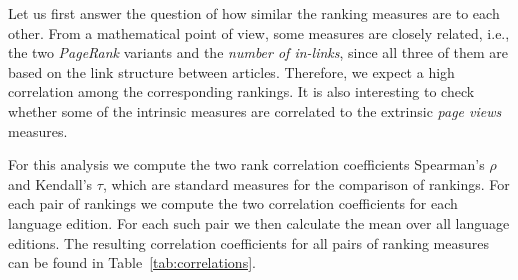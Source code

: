 \documentclass[a4paper,12pt]{scrartcl}
\begin{document}
Let us first answer the question of how similar the ranking measures
are to each other.
%
From a mathematical point of view, some measures are closely related,
i.e., the two \emph{PageRank} variants and the \emph{number of
  in-links}, since all three of them are based on the link structure
between articles.
%
Therefore, we expect a high correlation among the corresponding
rankings.
%
It is also interesting to check whether some of the intrinsic
measures are correlated to the extrinsic \emph{page views} measures.

\enlargethispage{\baselineskip}

For this analysis we compute the two rank correlation coefficients
Spearman's $\rho$ and Kendall's $\tau$, which are standard measures for
the comparison of rankings.
%
For each pair of rankings we compute the two correlation coefficients
for each language edition. For each such pair we then calculate the
mean over all language editions.
%
The resulting correlation coefficients for all pairs of ranking
measures can be found in Table~\ref{tab:correlations}.
%
%
%
\end{document}
